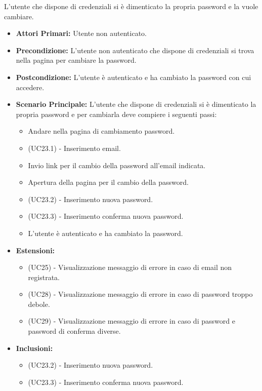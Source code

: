 L'utente che dispone di credenziali si è dimenticato la propria password e la vuole cambiare.
\begin{itemize}
    \item \textbf{Attori Primari:} Utente non autenticato.
    \item \textbf{Precondizione:} L'utente non autenticato che dispone di credenziali si trova nella pagina per cambiare la password.
    \item \textbf{Postcondizione:} L'utente è autenticato e ha cambiato la password con cui accedere.
    \item \textbf{Scenario Principale:} L'utente che dispone di credenziali si è dimenticato la propria password e per cambiarla deve compiere i seguenti passi:
    \begin{itemize}
        \item Andare nella pagina di cambiamento password. 
        \item (UC23.1) - Inserimento email.
        \item Invio link per il cambio della password all'email indicata.
        \item Apertura della pagina per il cambio della password.
        \item (UC23.2) - Inserimento nuova password.
        \item (UC23.3) - Inserimento conferma nuova password.
        \item L'utente è autenticato e ha cambiato la password.
    \end{itemize}
    \item \textbf{Estensioni:}
    \begin{itemize}
        \item (UC25) - Visualizzazione messaggio di errore in caso di email non registrata.
        \item (UC28) - Visualizzazione messaggio di errore in caso di password troppo debole. 
        \item (UC29) - Visualizzazione messaggio di errore in caso di password e password di conferma diverse. 
    \end{itemize}
    \item \textbf{Inclusioni:}
    \begin{itemize}
        \item (UC23.2) - Inserimento nuova password.
        \item (UC23.3) - Inserimento conferma nuova password.
    \end{itemize}
\end{itemize}

